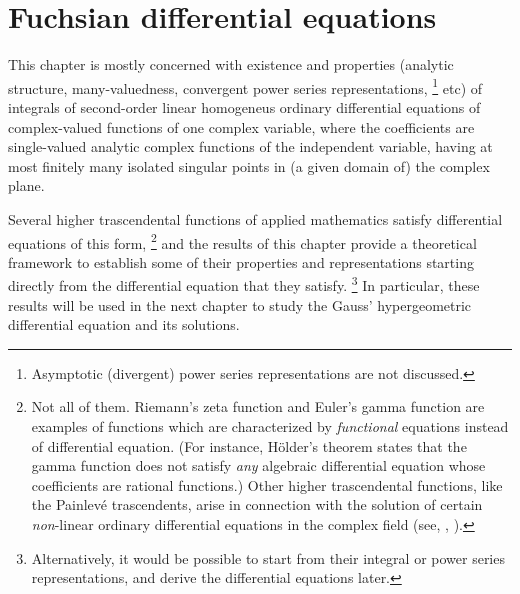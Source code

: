 \chapter{Fuchsian differential equations}
\label{chap:fuchs}


This chapter is mostly concerned with existence and properties (analytic structure, many-valuedness,
convergent power series representations,%
\footnote{Asymptotic (divergent) power series
   representations are not discussed.}
etc) of integrals of second-order linear homogeneus ordinary differential equations of complex-valued functions of one complex variable, 
where the coefficients
are single-valued analytic complex functions of the independent variable, having
at most finitely many isolated singular points in (a given domain of) the
complex plane.







Several
   higher trascendental functions of applied
mathematics satisfy differential equations of this form,%
\footnote{Not all of them. Riemann's zeta function and Euler's gamma function are examples of
   functions which are characterized by \emph{functional} equations
   instead of differential equation. (For instance, H\"older's theorem states that
   the gamma function does not satisfy \emph{any} algebraic differential equation
   whose coefficients are rational functions.) Other higher trascendental
   functions, like the Painlev\'e trascendents, arise in connection with the
   solution of certain \emph{non}-linear ordinary differential equations in the
   complex field (see, \eg, \textcite{Ince:1956}).}
   and the results of this chapter
provide a theoretical framework to establish some of their
properties and representations starting directly from the differential equation that they satisfy.%
\footnote{Alternatively, it would be possible to start from
   their integral or power series representations, 
   and derive the differential
   equations later.} In particular, these results will be used 
in the next chapter to study the Gauss' hypergeometric
differential equation and its solutions.

